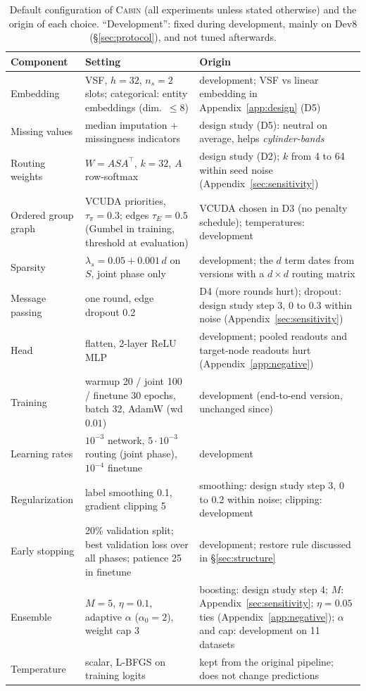 \documentclass[anon,12pt]{clear2027} %
\newcommand{\Cabin}{\textsc{Cabin}}
\newcommand{\T}{^{\top}}
\begin{document}
\begin{table}[h]
\centering
\caption{Default configuration of \Cabin{} (all experiments unless stated otherwise) and the origin of each choice. ``Development'': fixed during development, mainly on Dev8 (\S\ref{sec:protocol}), and not tuned afterwards.}
\label{tab:hyper}
\small
\begin{tabular}{@{}L{2.6cm}L{5.6cm}L{6.0cm}@{}}
\toprule
Component & Setting & Origin \\
\midrule
Embedding & VSF, $h=32$, $n_s=2$ slots; categorical: entity embeddings (dim.\ $\le 8$) & development; VSF vs linear embedding in Appendix~\ref{app:design} (D5) \\
Missing values & median imputation + missingness indicators & design study (D5): neutral on average, helps \emph{cylinder-bands} \\
Routing weights & $W=ASA\T$, $k=32$, $A$ row-softmax & design study (D2); $k$ from 4 to 64 within seed noise (Appendix~\ref{sec:sensitivity}) \\
Ordered group graph & VCUDA priorities, $\tau_\pi=0.3$; edges $\tau_E=0.5$ (Gumbel in training, threshold at evaluation) & VCUDA chosen in D3 (no penalty schedule); temperatures: development \\
Sparsity & $\lambda_s=0.05+0.001\,d$ on $S$, joint phase only & development; the $d$ term dates from versions with a $d\times d$ routing matrix \\
Message passing & one round, edge dropout 0.2 & D4 (more rounds hurt); dropout: design study step 3, 0 to 0.3 within noise (Appendix~\ref{sec:sensitivity}) \\
Head & flatten, 2-layer ReLU MLP & development; pooled readouts and target-node readouts hurt (Appendix~\ref{app:negative}) \\
Training & warmup 20 / joint 100 / finetune 30 epochs, batch 32, AdamW (wd $0.01$) & development (end-to-end version, unchanged since) \\
Learning rates & $10^{-3}$ network, $5\cdot10^{-3}$ routing (joint phase), $10^{-4}$ finetune & development \\
Regularization & label smoothing 0.1, gradient clipping 5 & smoothing: design study step 3, 0 to 0.2 within noise; clipping: development \\
Early stopping & 20\% validation split; best validation loss over all phases; patience 25 in finetune & development; restore rule discussed in \S\ref{sec:structure} \\
Ensemble & $M=5$, $\eta=0.1$, adaptive $\alpha$ ($\alpha_0=2$), weight cap 3 & boosting: design study step 4; $M$: Appendix~\ref{sec:sensitivity}; $\eta=0.05$ ties (Appendix~\ref{app:negative}); $\alpha$ and cap: development on 11 datasets \\
Temperature & scalar, L-BFGS on training logits & kept from the original pipeline; does not change predictions \\
\bottomrule
\end{tabular}
\end{table}
\end{document}
